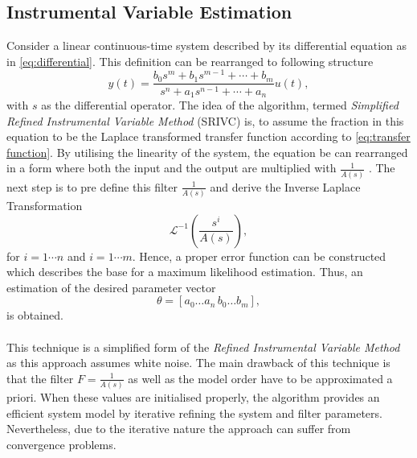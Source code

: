 \documentclass[english]{isasthesis}
\begin{document}
    	\subsection{Instrumental Variable Estimation} \label{SRIVC}
    	Consider a linear continuous-time system described by its differential equation as in \eqref{eq:differential}. This definition can be rearranged to following structure 
    	\begin{equation}
    	y(t) = \frac{b_0s^m + b_1s^{m-1} + \cdots + b_m }{s^n + a_1s^{n-1} + \cdots + a_n} u(t),
    	\end{equation}
    	with $s$ as the differential operator. The idea of the algorithm, termed \textit{Simplified Refined Instrumental Variable Method} (SRIVC) is, to assume the fraction in this equation to be the Laplace transformed transfer function according to \eqref{eq:transfer function}. By utilising the linearity of the system, the equation be can rearranged in a form where both the input and the output are multiplied with $\frac{1}{A(s)}$ \cite{young2006optimal}. The next step is to pre define this filter $\frac{1}{A(s)}$ and derive the Inverse Laplace Transformation 
    	\begin{equation}
    	\mathcal{L}^{-1}(\frac{s^i}{A(s)}),
    	\end{equation}
    	for $i = 1 \cdots n$ and $i = 1 \cdots m$. Hence, a proper error function can be constructed which describes the base for a maximum likelihood estimation. Thus, an estimation of the desired parameter vector 
    	\begin{equation}
    	\theta = [a_0 \dots a_n \, b_0 \dots b_m], 
		\end{equation}
		is obtained. \\ \\
		This technique is a simplified form of the \textit{Refined Instrumental Variable Method} as this approach assumes white noise. The main drawback of this technique is that the filter $ F = \frac{1}{A(s)}$ as well as the model order have to be approximated a priori. When these values are initialised properly, the algorithm provides an efficient system model by iterative refining the system and filter parameters. Nevertheless, due to the iterative nature the approach can suffer from convergence problems. 
\end{document}
